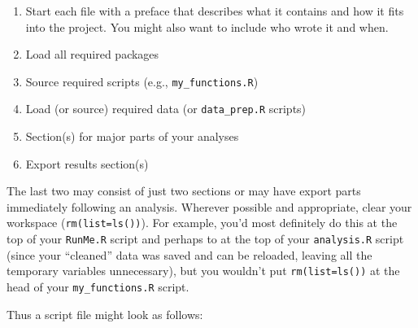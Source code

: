 \documentclass[12pt,letterpaper]{article}
\begin{document}
\begin{enumerate}

	\item Start each file with a preface that describes what it contains and how it fits into the project. You might also want to include who wrote it and when.
	
	\item Load all required packages
	
	\item Source required scripts (e.g., \texttt{my\_functions.R})
	
	\item Load (or source) required data (or \texttt{data\_prep.R} scripts)
	
	\item Section(s) for major parts of your analyses
	
	\item Export results section(s)

\end{enumerate}
The last two may consist of just two sections or may have export parts immediately following an analysis.  Wherever possible and appropriate, clear your workspace (\texttt{rm(list=ls())}).  For example, you'd most definitely do this at the top of your \texttt{RunMe.R} script and perhaps to at the top of your \texttt{analysis.R} script (since your ``cleaned'' data was saved and can be reloaded, leaving all the temporary variables unnecessary), but you wouldn't put \texttt{rm(list=ls())} at the head of your \texttt{my\_functions.R} script.

Thus a script file might look as follows:
\end{document}
